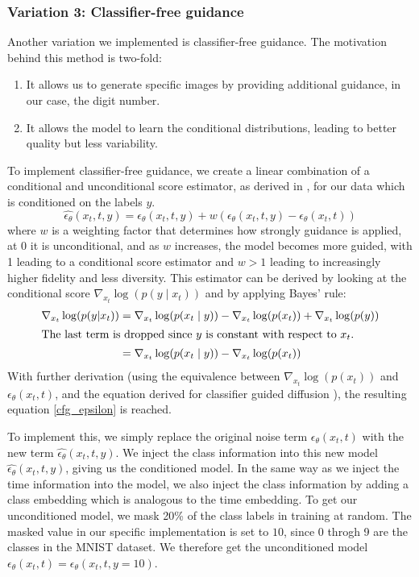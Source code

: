 \subsubsection{Variation 3: Classifier-free guidance}
Another variation we implemented is classifier-free guidance.
The motivation behind this method is two-fold:
\begin{enumerate}
  \item It allows us to generate specific images by providing additional guidance, in our case, the digit number.
  \item It allows the model to learn the conditional distributions, leading to better quality but less variability.
\end{enumerate}



To implement classifier-free guidance, we create a linear combination of a conditional and unconditional score estimator, as derived in \cite{classifier_free_guidance}, for our data which is conditioned on the labels
$y$.
\begin{equation}
  \hat{\epsilon_\theta}(x_t, t, y) = \epsilon_\theta(x_t, t, y) + w (\epsilon_\theta(x_t, t, y) - \epsilon_\theta(x_t, t))\label{cfg_epsilon}
\end{equation}
where $w$ is a weighting factor that determines how strongly guidance is applied, at 0 it is unconditional, and as $w$ increases, the model becomes more guided,
with 1 leading to a conditional score estimator and $w > 1$ leading to increasingly higher fidelity and less diversity.
This estimator can be derived by looking at the conditional score $\nabla_{x_t} \log (p(y \mid x_t))$
and by applying Bayes' rule:
\begin{align}
  \nabla_{x_t} \log (p(y|x_t)) &= \nabla_{x_t} \log (p(x_t \mid y)) - \nabla_{x_t} \log (p(x_t)) + \nabla_{x_t} \log (p(y))\\
  \intertext{The last term is dropped since $y$ is constant with respect to $x_t$.}
  &= \nabla_{x_t} \log (p(x_t \mid y)) - \nabla_{x_t} \log (p(x_t))
\end{align}
With further derivation (using the equivalence between $\nabla_{x_t} \log (p(x_t))$ and $\epsilon_\theta(x_t, t)$, and the equation derived for classifier guided diffusion \cite{classifier_free_guidance}), the resulting equation \ref{cfg_epsilon} is reached. 

To implement this, we simply replace the original noise term $\epsilon_\theta(x_t, t)$ with the new term $\hat{\epsilon_\theta}(x_t, t, y)$.
We inject the class information into this new model $\hat{\epsilon_\theta}(x_t, t, y)$, giving us 
the conditioned model.
In the same way as we inject the time information into the model, we also inject the class information by adding a class embedding
which is analogous to the time embedding.
To get our unconditioned model, we mask 20\% of the class labels in training at random.
The masked value in our specific implementation is set to $10$, since 0 throgh 9 are 
the classes in the MNIST dataset.
We therefore get the unconditioned model $\epsilon_\theta(x_t, t) = \epsilon_\theta(x_t, t, y=10)$.

